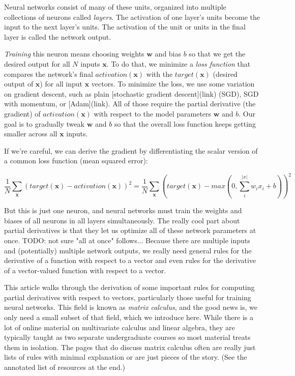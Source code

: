 \documentclass[11pt]{article}
\begin{document}
Neural networks consist of many of these units, organized into multiple collections of neurons called {\em layers}. The activation of one layer's units become the input to the next layer's units. The activation of the unit or units in the final layer is called the network output.

{\em Training} this neuron means choosing weights $\mathbf{w}$ and bias $b$ so that we get the desired output for all $N$ inputs $\mathbf{x}$.  To do that, we minimize a {\em loss function} that compares the network's final $activation({\mathbf{x}})$ with the $target(\mathbf{x})$ (desired output of $\mathbf{x}$) for all input $\mathbf{x}$ vectors. To minimize the loss, we use some variation on gradient descent, such as plain [stochastic gradient descent](link) (SGD), SGD with momentum, or [Adam](link).   All of those require the partial derivative (the gradient) of $activation({\mathbf{x}})$ with respect to the model parameters $\mathbf{w}$ and $b$. Our goal is to gradually tweak $\mathbf{w}$ and $b$ so that the overall loss function keeps getting smaller across all $\mathbf{x}$ inputs.

If we're careful, we can derive the gradient by differentiating the scalar version of a common loss function (mean squared error):

\[\frac{1}{N} \sum_{\mathbf{x}} (target(\mathbf{x}) - activation(\mathbf{x}))^2 = \frac{1}{N} \sum_{\mathbf{x}} (target(\mathbf{x}) - max(0, \sum_i^{|x|} w_i x_i + b))^2\]

But this is just one neuron, and neural networks must train the weights and biases of all neurons in all layers simultaneously.  The really cool part about partial derivatives is that they let us optimize all of these network parameters at once. TODO: not sure "all at once" follows... Because there are multiple inputs and (potentially) multiple network outputs, we really need general rules for the derivative of a function with respect to a vector and even rules for the derivative of a vector-valued function with respect to a vector.

This article walks through the derivation of some important rules for computing partial derivatives with respect to vectors, particularly those useful for training neural networks. This field is known as {\em matrix calculus}, and the good news is, we only need a small subset of that field, which we introduce here.  While there is a lot of online material on multivariate calculus and linear algebra, they are typically taught as two separate undergraduate courses so most material treats them in isolation.  The pages that do discuss matrix calculus often are really just lists of rules with minimal explanation or are just pieces of the story. (See the annotated list of resources at the end.)
\end{document}
